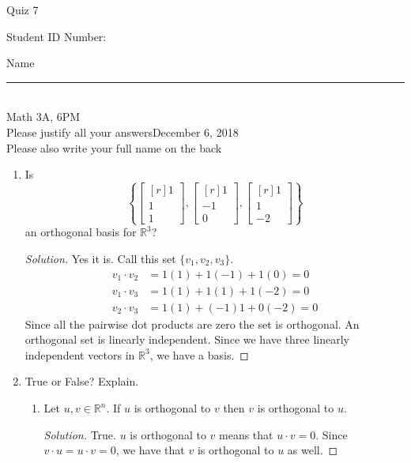 \documentclass[12pt]{article}
\newenvironment{solution}
{\begin{proof}[Solution]}
{\end{proof}}
\begin{document}
\begin{flushleft} 
\centerline{\LARGE{Quiz 7}} 
\vspace{5 mm}
{Student ID Number:}\hfill  
{Name \rule {2 in}{0.01in}}\\
Math 3A, 6PM
\\
{Please justify all your answers}\hfill {December 6, 2018}
\\
{Please also write your full name on the back} 

\medskip
\end{flushleft}

\begin{enumerate}
	\item Is
	\[
	\left\{\begin{bmatrix*}[r]
		1\\1\\1
	\end{bmatrix*}, \begin{bmatrix*}[r]
		1\\-1\\0
	\end{bmatrix*}, \begin{bmatrix*}[r]
		1\\1\\-2
	\end{bmatrix*}\right\}
	\]
	an orthogonal basis for $\mathbb{R}^3$?
	\begin{solution}
		Yes it is. Call this set $\{v_1, v_2, v_3\}$.
		\begin{align*}
			v_1\cdot v_2 &= 1(1) + 1(-1) + 1(0) = 0\\
			v_1\cdot v_3 &= 1(1) + 1(1) + 1(-2) = 0\\
			v_2\cdot v_3 &= 1(1) + (-1)1 + 0(-2) = 0
		\end{align*}
		Since all the pairwise dot products are zero the set is orthogonal. An orthogonal set is linearly independent. Since we have three linearly independent vectors in $\mathbb{R}^3$, we have a basis.
	\end{solution}

	\vfill

	\item True or False? Explain.
	\begin{enumerate}
		\item Let $u,v\in \mathbb{R}^n$. If $u$ is orthogonal to $v$ then $v$ is orthogonal to $u$.
		\begin{solution}
			True. $u$ is orthogonal to $v$ means that $u\cdot v = 0$. Since $v\cdot u = u\cdot v = 0$, we have that $v$ is orthogonal to $u$ as well.
		\end{solution}


\end{enumerate}
\end{enumerate}
\end{document}
